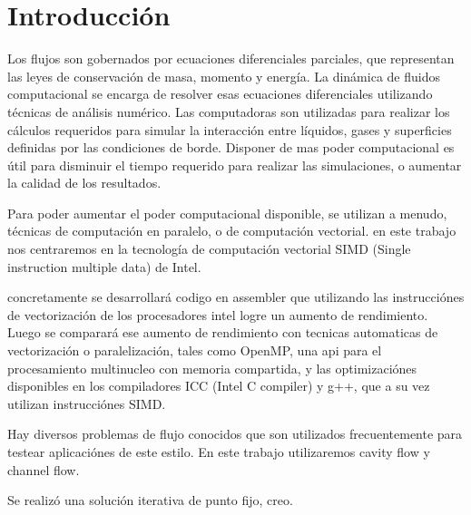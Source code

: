 \section{Introducción}%
Los flujos son gobernados por ecuaciones diferenciales parciales, que representan las leyes de conservación de masa, momento y energía. La dinámica de fluidos computacional se encarga de resolver esas ecuaciones diferenciales utilizando técnicas de análisis numérico. Las computadoras son utilizadas para realizar los cálculos requeridos para simular la interacción entre líquidos, gases y superficies definidas por las condiciones de borde. Disponer de mas poder computacional es útil para disminuir el tiempo requerido para realizar las simulaciones, o aumentar la calidad de los resultados.

Para poder aumentar el poder computacional disponible, se utilizan a menudo, técnicas de computación en paralelo, o de computación vectorial. en este trabajo nos centraremos en la tecnología de computación vectorial SIMD (Single instruction multiple data) de Intel.

concretamente se desarrollará codigo en assembler que utilizando las instrucciónes de vectorización de los procesadores intel logre un aumento de rendimiento. Luego se comparará ese aumento de rendimiento con tecnicas automaticas de vectorización o paralelización, tales como OpenMP, una api para el procesamiento multinucleo con memoria compartida, y las optimizaciónes disponibles en los compiladores ICC (Intel C compiler) y g++, que a su vez utilizan instrucciónes SIMD.

Hay diversos problemas de flujo conocidos que son utilizados frecuentemente para testear aplicaciónes de este estilo. En este trabajo utilizaremos cavity flow y channel flow.


Se realizó una solución iterativa de punto fijo, creo.
